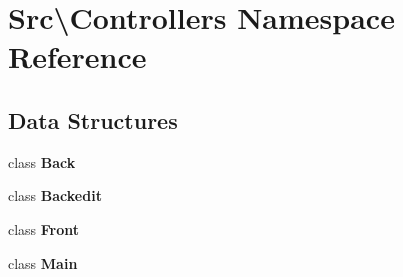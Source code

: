 \section{Src\textbackslash{}Controllers Namespace Reference}
\label{namespace_src_1_1_controllers}
\subsection*{Data Structures}
\begin{DoxyCompactItemize}
\item 
class \textbf{ Back}
\item 
class \textbf{ Backedit}
\item 
class \textbf{ Front}
\item 
class \textbf{ Main}
\end{DoxyCompactItemize}
